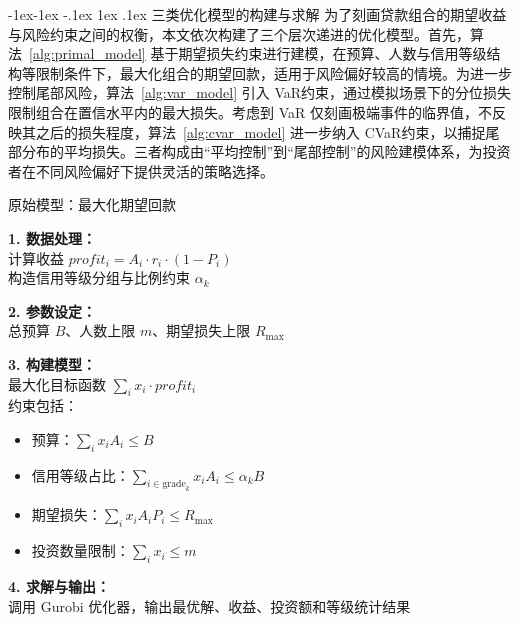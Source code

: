 \documentclass{write_paper}
\makeatletter
\renewcommand\subsection{\@startsection{subsection}{2}{\z@}%
                                     {-1ex\@plus -1ex \@minus -.1ex}%
                                     {1ex \@plus .1ex}%
                                     {\normalfont \normalsize \bfseries}}
\makeatother
\begin{document}
\subsection{三类优化模型的构建与求解}
为了刻画贷款组合的期望收益与风险约束之间的权衡，本文依次构建了三个层次递进的优化模型。首先，算法~\ref{alg:primal_model} 基于期望损失约束进行建模，在预算、人数与信用等级结构等限制条件下，最大化组合的期望回款，适用于风险偏好较高的情境。为进一步控制尾部风险，算法~\ref{alg:var_model} 引入 VaR约束，通过模拟场景下的分位损失限制组合在置信水平内的最大损失。考虑到 VaR 仅刻画极端事件的临界值，不反映其之后的损失程度，算法~\ref{alg:cvar_model} 进一步纳入 CVaR约束，以捕捉尾部分布的平均损失。三者构成由“平均控制”到“尾部控制”的风险建模体系，为投资者在不同风险偏好下提供灵活的策略选择。
\label{subsec:model_solving}
 \begin{algorithm}[htbp]  \footnotesize
\caption{原始模型：最大化期望回款}
\label{alg:primal_model}

\textbf{1. 数据处理：} \\
计算收益 $profit_i = A_i \cdot r_i \cdot (1 - P_i)$ \\
构造信用等级分组与比例约束 $\alpha_k$

\textbf{2. 参数设定：} \\
总预算 $B$、人数上限 $m$、期望损失上限 $R_{\max}$

\textbf{3. 构建模型：} \\
最大化目标函数 $\sum_i x_i \cdot profit_i$ \\
约束包括：
\begin{itemize}
  \item 预算：$\sum_i x_i A_i \leq B$
  \item 信用等级占比：$\sum_{i \in \text{grade}_k} x_i A_i \leq \alpha_k B$
  \item 期望损失：$\sum_i x_i A_i P_i \leq R_{\max}$
  \item 投资数量限制：$\sum_i x_i \leq m$
\end{itemize}

\textbf{4. 求解与输出：} \\
调用 Gurobi 优化器，输出最优解、收益、投资额和等级统计结果
\end{algorithm}
\end{document}
